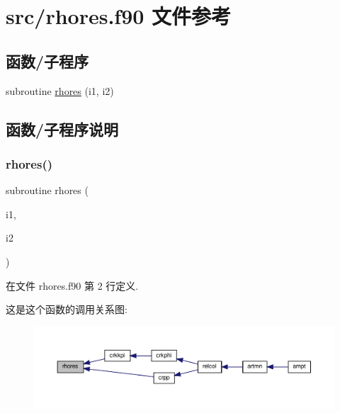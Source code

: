 \hypertarget{rhores_8f90}{}\section{src/rhores.f90 文件参考}
\label{rhores_8f90}
\subsection*{函数/子程序}
\begin{DoxyCompactItemize}
\item 
subroutine \mbox{\hyperlink{rhores_8f90_aec73ce27aa6660b9c1de48c69085bea9}{rhores}} (i1, i2)
\end{DoxyCompactItemize}


\subsection{函数/子程序说明}
\mbox{\label{rhores_8f90_aec73ce27aa6660b9c1de48c69085bea9}} 
\subsubsection{\texorpdfstring{rhores()}{rhores()}}
{\footnotesize\ttfamily subroutine rhores (\begin{DoxyParamCaption}\item[{}]{i1,  }\item[{}]{i2 }\end{DoxyParamCaption})}



在文件 rhores.\+f90 第 2 行定义.

这是这个函数的调用关系图\+:
\nopagebreak
\begin{figure}[H]
\begin{center}
\leavevmode
\includegraphics[width=350pt]{rhores_8f90_aec73ce27aa6660b9c1de48c69085bea9_icgraph}
\end{center}
\end{figure}
